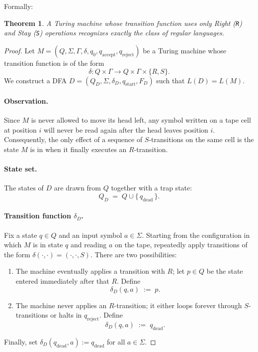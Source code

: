 \documentclass[a4paper, UTF-8]{article}
\theoremstyle{plain}
\newtheorem{theorem}{\indent Theorem}[section]
\begin{document}
Formally: 

\begin{theorem}
    A Turing machine whose transition function uses only \emph{Right} (\texttt{R}) and \emph{Stay} (\texttt{S}) operations recognizes exactly the class of regular languages.
\end{theorem}

\begin{proof}
    Let $M = (Q, \Sigma, \Gamma, \delta, q_0, q_{\text{accept}}, q_{\text{reject}})$ be a Turing machine whose transition function is of the form
    \[
        \delta \colon Q \times \Gamma \longrightarrow Q \times \Gamma \times \{R, S\}.
    \]
    We construct a DFA $D = (Q_D, \Sigma, \delta_D, q_{\text{start}}, F_D)$ such that $L(D) = L(M)$.

    \paragraph{Observation.}
    Since $M$ is never allowed to move its head left, any symbol written on a tape cell at position $i$ will never be read again after the head leaves position $i$. Consequently, the only effect of a sequence of $S$-transitions on the same cell is the state $M$ is in when it finally executes an $R$-transition.

    \paragraph{State set.}
    The states of $D$ are drawn from $Q$ together with a trap state:
    \[
        Q_D \;=\; Q \cup \{\,q_{\text{dead}}\,\}.
    \]

    \paragraph{Transition function $\delta_D$.}
    Fix a state $q \in Q$ and an input symbol $a \in \Sigma$.
    Starting from the configuration in which $M$ is in state $q$ and reading $a$ on the tape,
    repeatedly apply transitions of the form $\delta(\cdot, \cdot) = (\cdot, \cdot, S)$.
    There are two possibilities:
    \begin{enumerate}
        \item[(i)] The machine eventually applies a transition with $R$; let $p \in Q$ be the state entered immediately after that $R$.  Define
            \[
                \delta_D(q, a) \;:=\; p.
            \]
        \item[(ii)] The machine never applies an $R$-transition; it either loops forever through $S$-transitions or halts in $q_{\text{reject}}$.  Define
            \[
                \delta_D(q, a) \;:=\; q_{\text{dead}}.
            \]
    \end{enumerate}
    Finally, set $\delta_D(q_{\text{dead}}, a) := q_{\text{dead}}$ for all $a \in \Sigma$.


\end{proof}
\end{document}

